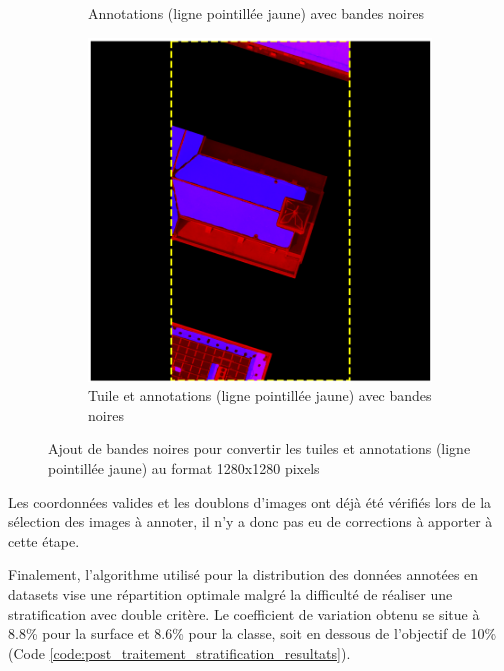 \begin{figure}[H]
\begin{subfigure}[b]{0.49\textwidth}
        \caption{Annotations (ligne pointillée jaune) avec bandes noires}
        \label{fig:ch3_postprocessing_dataset_17_verification_taille2}
    \end{subfigure}
    \begin{subfigure}[b]{0.49\textwidth}
        \centering
        \includegraphics[width=\textwidth]{02-main/figures/ch3/ch3_postprocessing_dataset_18_verification_taille3.png}
        \caption{Tuile et annotations (ligne pointillée jaune) avec bandes noires}
        \label{fig:ch3_postprocessing_dataset_18_verification_taille3}
    \end{subfigure}
    \caption{Ajout de bandes noires pour convertir les tuiles et annotations (ligne pointillée jaune) au format 1280x1280 pixels}
    \label{fig:ch3_postprocessing_dataset_verification_taille}
\end{figure}

Les coordonnées valides et les doublons d'images ont déjà été vérifiés lors de la sélection des images à annoter, il n'y a donc pas eu de corrections à apporter à cette étape.

Finalement, l'algorithme utilisé pour la distribution des données annotées en datasets vise une répartition optimale malgré la difficulté de réaliser une stratification avec double critère. Le coefficient de variation obtenu se situe à 8.8\% pour la surface et 8.6\% pour la classe, soit en dessous de l'objectif de 10\% (Code \ref{code:post_traitement_stratification_resultats}).

